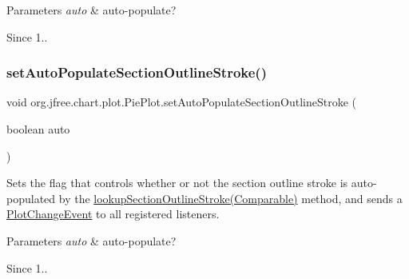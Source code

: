 \begin{DoxyParams}{Parameters}
{\em auto} & auto-\/populate?\\
\hline
\end{DoxyParams}
\begin{DoxySince}{Since}
1.. 
\end{DoxySince}
\mbox{\label{classorg_1_1jfree_1_1chart_1_1plot_1_1_pie_plot_a3ae6a4fe194017fea49136cc08bbad19}} 
\subsubsection{\texorpdfstring{set\+Auto\+Populate\+Section\+Outline\+Stroke()}{setAutoPopulateSectionOutlineStroke()}}
{\footnotesize\ttfamily void org.\+jfree.\+chart.\+plot.\+Pie\+Plot.\+set\+Auto\+Populate\+Section\+Outline\+Stroke (\begin{DoxyParamCaption}\item[{boolean}]{auto }\end{DoxyParamCaption})}

Sets the flag that controls whether or not the section outline stroke is auto-\/populated by the \mbox{\hyperlink{classorg_1_1jfree_1_1chart_1_1plot_1_1_pie_plot_a4d772d7522bd8413a7d03d2b70491560}{lookup\+Section\+Outline\+Stroke(\+Comparable)}} method, and sends a \mbox{\hyperlink{}{Plot\+Change\+Event}} to all registered listeners.


\begin{DoxyParams}{Parameters}
{\em auto} & auto-\/populate?\\
\hline
\end{DoxyParams}
\begin{DoxySince}{Since}
1.. 
\end{DoxySince}
\mbox{\label{classorg_1_1jfree_1_1chart_1_1plot_1_1_pie_plot_ab0c2aa9c5804efab0ee2cb5330455222}} 
